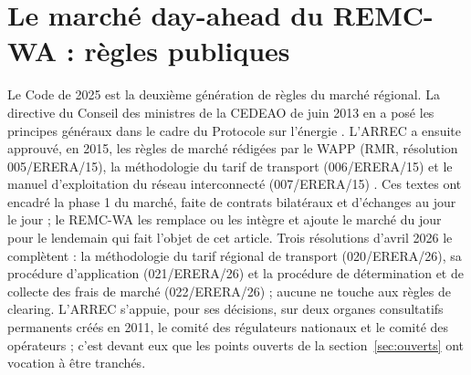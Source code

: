 \documentclass[a4paper,12pt]{article}
\theoremstyle{definition}
\begin{document}
\section{Le marché day-ahead du REMC-WA : règles publiques}\label{sec:code}

Le Code de 2025 est la deuxième génération de règles du marché régional. La directive du Conseil des ministres de la CEDEAO de juin 2013 en a posé les principes généraux dans le cadre du Protocole sur l'énergie \citep{ecowas2013directive}. L'ARREC a ensuite approuvé, en 2015, les règles de marché rédigées par le WAPP (RMR, résolution 005/ERERA/15), la méthodologie du tarif de transport (006/ERERA/15) et le manuel d'exploitation du réseau interconnecté (007/ERERA/15) \citep{erera2015rmr,erera2015tariff,erera2015manual}. Ces textes ont encadré la phase 1 du marché, faite de contrats bilatéraux et d'échanges au jour le jour ; le REMC-WA \citep{remcwa2025} les remplace ou les intègre et ajoute le marché du jour pour le lendemain qui fait l'objet de cet article. Trois résolutions d'avril 2026 le complètent : la méthodologie du tarif régional de transport (020/ERERA/26), sa procédure d'application (021/ERERA/26) et la procédure de détermination et de collecte des frais de marché (022/ERERA/26) \citep{erera2026rttm,erera2026rettap,erera2026fee} ; aucune ne touche aux règles de clearing. L'ARREC s'appuie, pour ses décisions, sur deux organes consultatifs permanents créés en 2011, le comité des régulateurs nationaux et le comité des opérateurs ; c'est devant eux que les points ouverts de la section~\ref{sec:ouverts} ont vocation à être tranchés.
\end{document}
